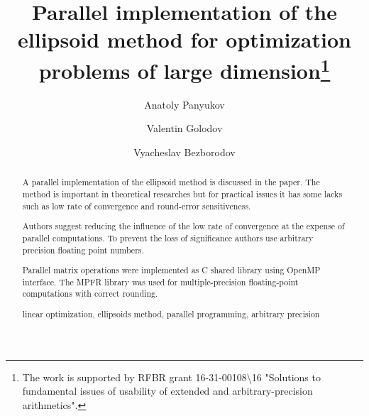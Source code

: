 \documentclass[runningheads,a4paper]{llncs}
\newcommand{\keywords}[1]{\par\addvspace\baselineskip
\noindent\keywordname\enspace\ignorespaces#1}
\begin{document}
\mainmatter  %

\title{Parallel implementation of the ellipsoid method for optimization problems of large dimension\thanks{The work is supported by RFBR grant 16-31-00108\textbackslash 16 "Solutions to fundamental issues of usability of extended and arbitrary-precision arithmetics".}}


%
%
\author{Anatoly Panyukov\and Valentin Golodov\and Vyacheslav Bezborodov}
%


%
%

\maketitle


\begin{abstract}
A parallel implementation of the ellipsoid method is discussed in the paper. The method is important in theoretical researches but for practical issues it has some lacks such as low rate of convergence and round-error sensitiveness.

Authors suggest reducing the influence of the low rate of convergence at the expense of parallel computations. To prevent the loss of significance authors use arbitrary precision floating point numbers.

Parallel matrix operations were implemented as C shared library using OpenMP interface. The MPFR library was used for multiple-precision floating-point computations with correct rounding.

\keywords{linear optimization, ellipsoids method, parallel programming, arbitrary precision}
\end{abstract}
\end{document}
